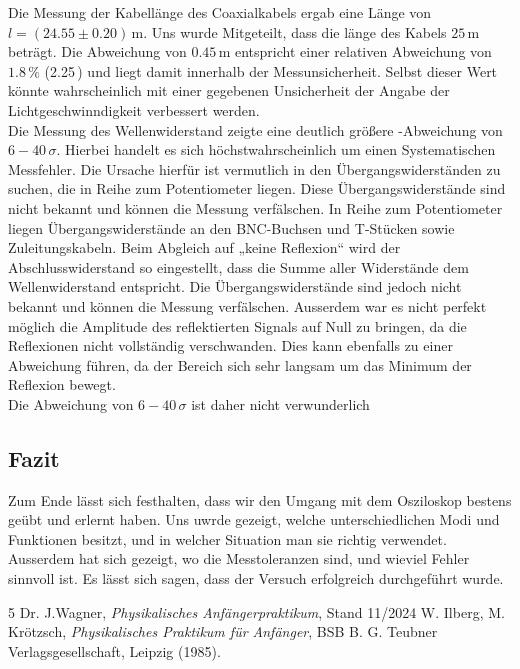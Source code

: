 \documentclass[12pt,a4paper,titlepage]{scrartcl}
\numberwithin{equation}{section}
\numberwithin{table}{section}
\numberwithin{figure}{section}
\begin{document}
Die Messung der Kabellänge des Coaxialkabels ergab eine Länge von $l = (24.55 \pm 0.20)\,\text{m}$. Uns wurde Mitgeteilt, dass die länge des Kabels $25\,\text{m}$ beträgt. Die Abweichung von $0.45\,\text{m}$ entspricht einer relativen Abweichung von $1.8\,\%$ (2.25\,\sigma) und liegt damit innerhalb der Messunsicherheit. Selbst dieser Wert könnte wahrscheinlich mit einer gegebenen Unsicherheit der Angabe der Lichtgeschwinndigkeit verbessert werden.\\
Die Messung des Wellenwiderstand zeigte eine deutlich größere \sigma-Abweichung von $6-40\,\sigma$. Hierbei handelt es sich höchstwahrscheinlich um einen Systematischen Messfehler. Die Ursache hierfür ist vermutlich in den Übergangswiderständen zu suchen, die in Reihe zum Potentiometer liegen. Diese Übergangswiderstände sind nicht bekannt und können die Messung verfälschen.
In Reihe zum Potentiometer liegen Übergangswiderstände an den BNC-Buchsen und T-Stücken sowie Zuleitungskabeln. Beim Abgleich auf „keine Reflexion“ wird der Abschlusswiderstand so eingestellt, dass die Summe aller Widerstände dem Wellenwiderstand entspricht. Die Übergangswiderstände sind jedoch nicht bekannt und können die Messung verfälschen. Ausserdem war es nicht perfekt möglich die Amplitude des reflektierten Signals auf Null zu bringen, da die Reflexionen nicht vollständig verschwanden. Dies kann ebenfalls zu einer Abweichung führen, da der Bereich sich sehr langsam um das Minimum der Reflexion bewegt.\\
Die Abweichung von $6-40\,\sigma$ ist daher nicht verwunderlich



\subsection{Fazit}
Zum Ende lässt sich festhalten, dass wir den Umgang mit dem Osziloskop bestens geübt und erlernt haben. Uns uwrde gezeigt, welche unterschiedlichen Modi und Funktionen besitzt, und in welcher Situation man sie richtig verwendet. Ausserdem hat sich gezeigt, wo die Messtoleranzen sind, und wieviel Fehler sinnvoll ist. Es lässt sich sagen, dass der Versuch erfolgreich durchgeführt wurde.

\clearpage

\listoffigures


\listoftables

\begin{thebibliography}{5}
     Dr. J.Wagner, \emph{Physikalisches Anfängerpraktikum}, Stand 11/2024
     W. Ilberg, M. Krötzsch, \emph{Physikalisches Praktikum für Anfänger}, BSB B. G. Teubner Verlagsgesellschaft, Leipzig (1985).
\end{thebibliography}
\end{document}
